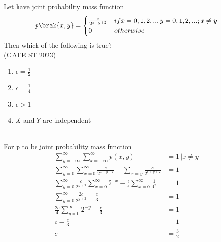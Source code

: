\documentclass[journal,12pt,twocolumn]{IEEEtran}
\theoremstyle{remark}
\begin{document}
Let  have joint probability mass function 
\begin{align}
p\brak{x,y}=  
	\begin{cases}
        \frac{c}{2^{x+y+2}} & if x=0,1,2,... \, y=0,1,2,...; x\neq y \\
        0 & otherwise
        \end{cases} 
\end{align} 
Then which of the following is true?\\
\hfill (GATE ST 2023) \\
\begin{enumerate}
\item $c = \frac{1}{2}$
\item $c = \frac{1}{4}$
\item $c > 1$
\item $X$ and $Y$ are independent
\end{enumerate}
\fi
\solution\\
For p to be joint probability mass function
\begin{align}
\sum\limits^{\infty}_{y=-\infty}\sum\limits^{\infty}_{x=-\infty}p(x,y)&=1 \, \vert x \neq y\\
\sum\limits^{\infty}_{y=0}\sum\limits^{\infty}_{x=0}\frac{c}{2^{x+y+2}}- \sum\limits_{x=y} \frac{c}{2^{x+y+2}}&=1\\
\sum\limits^{\infty}_{y=0}\frac{c}{2^{y+2}} \sum\limits^{\infty}_{x=0} 2^{-x}- \frac{c}{4}\sum\limits^{\infty}_{x=0}\frac{1}{4^x}&=1\\
\sum\limits^{\infty}_{y=0}\frac{2c}{2^{y+2}}- \frac{c}{3}&=1\\
\frac{2c}{4}\sum\limits^{\infty}_{y=0}2^{-y}-\frac{c}{3}&=1\\
c-\frac{c}{3}&=1\\
c&=\frac{3}{2}
\end{align}
\end{document}
